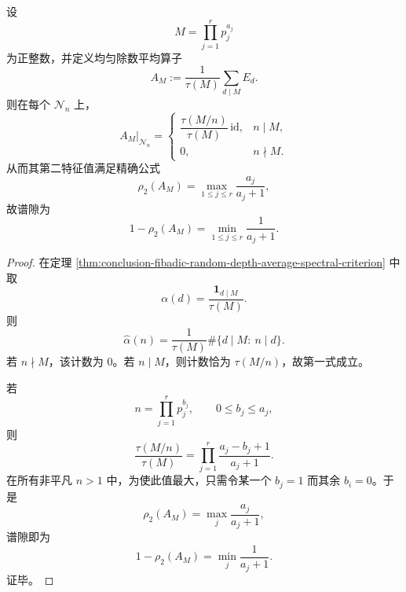 \begin{corollary}[均匀除数随机化的精确谱隙公式]\label{cor:conclusion-fibadic-uniform-divisor-randomization-gap}
设
\[
M=\prod_{j=1}^r p_j^{a_j}
\]
为正整数，并定义均匀除数平均算子
\[
A_M:=\frac{1}{\tau(M)}\sum_{d\mid M}E_d.
\]
则在每个 \(\mathcal N_n\) 上，
\[
A_M|_{\mathcal N_n}=
\begin{cases}
\dfrac{\tau(M/n)}{\tau(M)}\,\mathrm{id}, & n\mid M,\\[1.2ex]
0, & n\nmid M.
\end{cases}
\]
从而其第二特征值满足精确公式
\[
\rho_2(A_M)=\max_{1\le j\le r}\frac{a_j}{a_j+1},
\]
故谱隙为
\[
1-\rho_2(A_M)=\min_{1\le j\le r}\frac{1}{a_j+1}.
\]
\end{corollary}
\begin{proof}
在定理 \ref{thm:conclusion-fibadic-random-depth-average-spectral-criterion} 中取
\[
\alpha(d)=\frac{\mathbf 1_{d\mid M}}{\tau(M)}.
\]
则
\[
\widehat\alpha(n)
=
\frac{1}{\tau(M)}\#\{d\mid M:\ n\mid d\}.
\]
若 \(n\nmid M\)，该计数为 \(0\)。若 \(n\mid M\)，则计数恰为 \(\tau(M/n)\)，故第一式成立。

若
\[
n=\prod_{j=1}^r p_j^{b_j},
\qquad
0\le b_j\le a_j,
\]
则
\[
\frac{\tau(M/n)}{\tau(M)}
=
\prod_{j=1}^r \frac{a_j-b_j+1}{a_j+1}.
\]
在所有非平凡 \(n>1\) 中，为使此值最大，只需令某一个 \(b_j=1\) 而其余 \(b_i=0\)。于是
\[
\rho_2(A_M)=\max_j\frac{a_j}{a_j+1},
\]
谱隙即为
\[
1-\rho_2(A_M)=\min_j\frac{1}{a_j+1}.
\]
证毕。
\end{proof}

